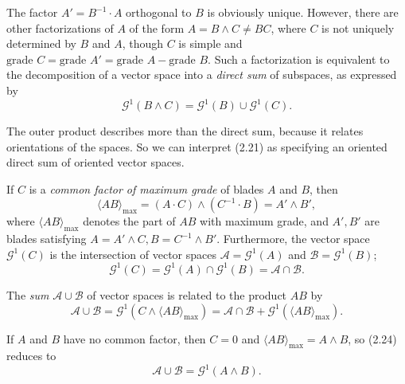 \documentclass[fleqn]{scrartcl}
\numberwithin{equation}{section}
\begin{document}
\noindent The factor \(A' = B^{-1} \cdot A\) orthogonal to \(B\) is obviously unique. However, there are other factorizations of \(A\) of the form \(A = B \wedge C \neq BC\), where \(C\) is not uniquely determined by \(B\) and \(A\), though \(C\) is simple and \(\text{grade } C = \text{grade } A' = \text{grade } A - \text{grade } B\). Such a factorization is equivalent to the decomposition of a vector space into a \textit{direct sum} of subspaces, as expressed by
\begin{equation}
\mathscr{G}^1(B \wedge C) = \mathscr{G}^1(B) \cup \mathscr{G}^1(C). \tag{2.21}
\end{equation}

\noindent The outer product describes more than the direct sum, because it relates orientations of the spaces. So we can interpret (2.21) as specifying an oriented direct sum of oriented vector spaces.

\vspace{1em}
\noindent If \(C\) is a \textit{common factor of maximum grade} of blades \(A\) and \(B\), then
\begin{equation}
\langle AB \rangle_{\text{max}} = (A \cdot C) \wedge (C^{-1} \cdot B) = A' \wedge B', \tag{2.22}
\end{equation}
where \(\langle AB \rangle_{\text{max}}\) denotes the part of \(AB\) with maximum grade, and \(A', B'\) are blades satisfying \(A = A' \wedge C, B = C^{-1} \wedge B'\). Furthermore, the vector space \(\mathscr{G}^1(C)\) is the intersection of vector spaces \(\mathscr{A} = \mathscr{G}^1(A)\) and \(\mathscr{B} = \mathscr{G}^1(B)\);
\begin{equation}
\mathscr{G}^1(C) = \mathscr{G}^1(A) \cap \mathscr{G}^1(B) = \mathscr{A} \cap \mathscr{B}. \tag{2.23}
\end{equation}

\noindent The \textit{sum} \(\mathscr{A} \cup \mathscr{B}\) of vector spaces is related to the product \(AB\) by
\begin{equation}
\mathscr{A} \cup \mathscr{B} = \mathscr{G}^1(C \wedge \langle AB \rangle_{\text{max}}) = \mathscr{A} \cap \mathscr{B} + \mathscr{G}^1(\langle AB \rangle_{\text{max}}). \tag{2.24}
\end{equation}

\noindent If \(A\) and \(B\) have no common factor, then \(C = 0\) and \(\langle AB \rangle_{\text{max}} = A \wedge B\), so (2.24) reduces to
\begin{equation}
\mathscr{A} \cup \mathscr{B} = \mathscr{G}^1(A \wedge B). \tag{2.25}
\end{equation}
\end{document}
